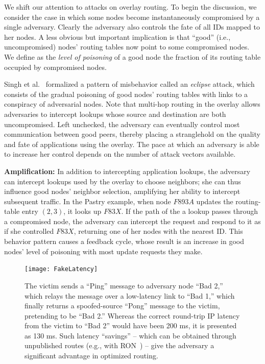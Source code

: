 \documentclass[10pt,twocolumn]{article}
\renewcommand{\paragraph}[1]{\textbf{#1:}}
\begin{document}
\label{sec:eclipses}
We shift our attention to attacks
on overlay routing.
To begin the discussion, we consider the case
in which some nodes become instantaneously compromised by a
single adversary.  Clearly the adversary also controls the fate of all
IDs mapped to her nodes.  A less obvious but 
important implication is that ``good'' (i.e., uncompromised) nodes'
routing tables now point to some compromised nodes.  We define as 
the \emph{level of poisoning} of a good node 
the
fraction of its routing table occupied by compromised nodes.


Singh et al.~\cite{Singh2004} formalized a pattern of misbehavior called 
an \emph{eclipse} attack, which consists of the gradual poisoning of good nodes' 
routing tables with links to a conspiracy of adversarial nodes. Note
that multi-hop routing in the overlay allows adversaries to intercept lookups
whose source and destination are both uncompromised. Left unchecked,
the adversary can eventually control most communication between good
peers, thereby placing a stranglehold on the quality and fate of
applications using the overlay.  The pace at which an adversary
is able to increase her control depends on the number of attack vectors available.


\paragraph{Amplification} In addition to intercepting application lookups,
the adversary can intercept lookups used by the overlay to choose
neighbors; she can thus influence good nodes'
neighbor selection, amplifying her ability to intercept subsequent traffic.
In the Pastry example, when node $F893A$ updates
the routing-table entry $(2,3)$, it looks up $F83X$.  If the path of the a lookup passes through a
compromised node, the adversary can intercept the request and respond to
it as if she controlled $F83X$, returning one of her nodes with the nearest ID. This behavior 
pattern causes a feedback cycle, whose result is an increase in good nodes' level of poisoning 
with most update requests they make.

\begin{figure}
\centerline{\texttt{[image: FakeLatency]}}
\caption{
  The victim sends a ``Ping'' message to adversary node ``Bad
  2,'' which relays the message over a low-latency link to ``Bad 1,''
  which finally returns a spoofed-source ``Pong'' message to the
  victim, pretending to be ``Bad 2.''  Whereas the correct
  round-trip IP latency from the victim to ``Bad 2''
  would have been 200 ms, it is presented as 130 ms.  Such latency ``savings'' -- which can be obtained
  through unpublished routes (e.g., with
  RON~\cite{Andersen2001}) -- give the adversary a significant advantage in
  optimized routing.}
\label{fig:FakeLatency}
\end{figure}
\end{document}
